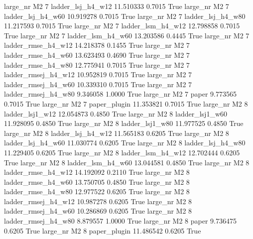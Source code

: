   large_nr       M2                 7   ladder_lsj_h4_w12   11.510333      0.7015    True
  large_nr       M2                 7   ladder_lsj_h4_w60   10.919278      0.7015    True
  large_nr       M2                 7   ladder_lsj_h4_w80   11.217593      0.7015    True
  large_nr       M2                 7   ladder_lsm_h4_w12   12.798858      0.7015    True
  large_nr       M2                 7   ladder_lsm_h4_w60   13.203586      0.4445    True
  large_nr       M2                 7  ladder_rmse_h4_w12   14.218378      0.1455    True
  large_nr       M2                 7  ladder_rmse_h4_w60   13.623493      0.4690    True
  large_nr       M2                 7  ladder_rmse_h4_w80   12.775941      0.7015    True
  large_nr       M2                 7 ladder_rmsej_h4_w12   10.952819      0.7015    True
  large_nr       M2                 7 ladder_rmsej_h4_w60   10.339310      0.7015    True
  large_nr       M2                 7 ladder_rmsej_h4_w80    9.346058      1.0000    True
  large_nr       M2                 7               paper    9.773565      0.7015    True
  large_nr       M2                 7        paper_plugin   11.353821      0.7015    True
  large_nr       M2                 8     ladder_lsj1_w12   12.054873      0.4850    True
  large_nr       M2                 8     ladder_lsj1_w60   11.928095      0.4850    True
  large_nr       M2                 8     ladder_lsj1_w80   11.977525      0.4850    True
  large_nr       M2                 8   ladder_lsj_h4_w12   11.565183      0.6205    True
  large_nr       M2                 8   ladder_lsj_h4_w60   11.030774      0.6205    True
  large_nr       M2                 8   ladder_lsj_h4_w80   11.229405      0.6205    True
  large_nr       M2                 8   ladder_lsm_h4_w12   12.702444      0.6205    True
  large_nr       M2                 8   ladder_lsm_h4_w60   13.044581      0.4850    True
  large_nr       M2                 8  ladder_rmse_h4_w12   14.192092      0.2110    True
  large_nr       M2                 8  ladder_rmse_h4_w60   13.750705      0.4850    True
  large_nr       M2                 8  ladder_rmse_h4_w80   12.977522      0.6205    True
  large_nr       M2                 8 ladder_rmsej_h4_w12   10.987278      0.6205    True
  large_nr       M2                 8 ladder_rmsej_h4_w60   10.286869      0.6205    True
  large_nr       M2                 8 ladder_rmsej_h4_w80    8.879557      1.0000    True
  large_nr       M2                 8               paper    9.736475      0.6205    True
  large_nr       M2                 8        paper_plugin   11.486542      0.6205    True
